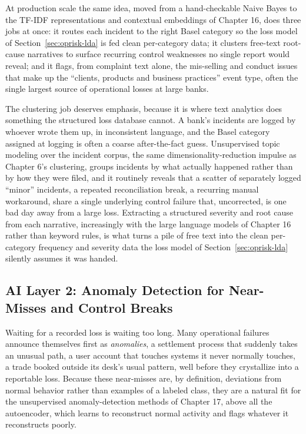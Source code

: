 \documentclass[../ai_in_finance]{subfiles}
\begin{document}
At production scale the same idea, moved from a hand-checkable Naive Bayes to the TF-IDF representations and contextual embeddings of Chapter 16, does three jobs at once: it routes each incident to the right Basel category so the loss model of Section~\ref{sec:oprisk-lda} is fed clean per-category data; it clusters free-text root-cause narratives to surface recurring control weaknesses no single report would reveal; and it flags, from complaint text alone, the mis-selling and conduct issues that make up the ``clients, products and business practices'' event type, often the single largest source of operational losses at large banks.

The clustering job deserves emphasis, because it is where text analytics does something the structured loss database cannot. A bank's incidents are logged by whoever wrote them up, in inconsistent language, and the Basel category assigned at logging is often a coarse after-the-fact guess. Unsupervised topic modeling over the incident corpus, the same dimensionality-reduction impulse as Chapter 6's clustering, groups incidents by what actually happened rather than by how they were filed, and it routinely reveals that a scatter of separately logged ``minor'' incidents, a repeated reconciliation break, a recurring manual workaround, share a single underlying control failure that, uncorrected, is one bad day away from a large loss. Extracting a structured severity and root cause from each narrative, increasingly with the large language models of Chapter 16 rather than keyword rules, is what turns a pile of free text into the clean per-category frequency and severity data the loss model of Section~\ref{sec:oprisk-lda} silently assumes it was handed.

\subsection{AI Layer 2: Anomaly Detection for Near-Misses and Control Breaks}
\label{sec:oprisk-anomaly}

Waiting for a recorded loss is waiting too long. Many operational failures announce themselves first as \emph{anomalies}, a settlement process that suddenly takes an unusual path, a user account that touches systems it never normally touches, a trade booked outside its desk's usual pattern, well before they crystallize into a reportable loss. Because these near-misses are, by definition, deviations from normal behavior rather than examples of a labeled class, they are a natural fit for the unsupervised anomaly-detection methods of Chapter 17, above all the autoencoder, which learns to reconstruct normal activity and flags whatever it reconstructs poorly.
\end{document}
